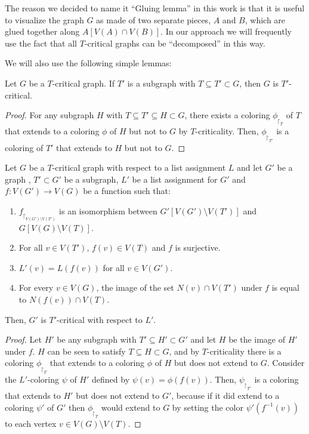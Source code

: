 The reason we decided to name it ``Gluing lemma'' in this work is that it is useful to visualize the graph $G$ as made of two separate pieces, $A$ and $B$, which are glued together along $A[V(A) \cap V(B)]$. In our approach we will frequently use the fact that all $T$-critical graphs can be ``decomposed'' in this way. 

We will also use the following simple lemmas:

\begin{lemma}
\label{extensionlemma}
Let $G$ be a $T$-critical graph. If $T'$ is a subgraph with 
$T \subseteq T' \subset G$, then $G$ is $T'$-critical.
\end{lemma}
\begin{proof}
For any subgraph $H$ with $T \subseteq T' \subseteq H \subset G$, there exists a coloring
$\phi_{\restriction_T}$ of $T$ that extends to a coloring $\phi$ of $H$ but not to $G$ by $T$-criticality. Then, $\phi_{\restriction_{T'}}$ is a coloring of $T'$ that extends to $H$ but not to $G$.
\end{proof}

\begin{lemma}
\label{duplicationlemma}
Let $G$ be a $T$-critical graph with respect to a list assignment $L$ and let $G'$ be a graph
, $T' \subset G'$ be a subgraph, $L'$ be a list assignment for $G'$ and $f : V(G') \rightarrow V(G)$ be a function such that:

\begin{enumerate}
	\item	$f_{\restriction_{V(G') \setminus V(T')}}$ is an isomorphism between 
	$G'[V(G') \setminus V(T')]$ and $G[V(G) \setminus V(T)]$.
	\item For all $v \in V(T')$, $f(v) \in V(T)$ and $f$ is surjective.  
	\item $L'(v) = L(f(v))$ for all $v \in V(G')$. 
	\item For every $v \in V(G)$, the image of the set $N(v) \cap V(T')$ under $f$
	is equal to $N(f(v)) \cap V(T)$.  
\end{enumerate}

Then, $G'$ is $T'$-critical with respect to $L'$.
 
\end{lemma}
\begin{proof}
Let $H'$ be any subgraph with $T' \subseteq H' \subset G'$ and let $H$ be the image of $H'$ under 
$f$. $H$ can be seen to satisfy $T \subseteq H \subset G$, and by $T$-criticality there is a 
coloring $\phi_{\restriction_T}$ that extends to a coloring $\phi$ of $H$ but does not extend to $G$.
Consider the $L'$-coloring $\psi$ of $H'$ defined by $\psi(v) = \phi(f(v))$. 
Then, $\psi_{\restriction_{T'}}$ is a coloring that extends to $H'$ but does not extend to $G'$,
because if it did extend to a coloring $\psi'$ of $G'$ 
then $\phi_{\restriction_T}$ would extend to $G$ by setting the
color $\psi'(f^{-1}(v))$ to each vertex $v \in V(G) \setminus V(T)$. 
\end{proof}

